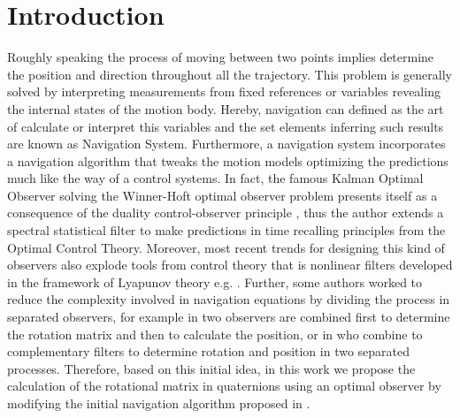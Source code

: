 \documentclass[10pt,conference]{IEEEtran}
\begin{document}
\section{Introduction}
Roughly speaking the process of moving between two points implies determine the position and direction throughout all the trajectory. This problem is generally solved by interpreting measurements from fixed references or variables revealing the internal states of the motion body. Hereby, navigation can defined as the art of calculate or interpret this variables and the set elements inferring such results are  known as Navigation System. Furthermore, a navigation system incorporates a navigation algorithm that tweaks the motion models optimizing the predictions much like the way of a control systems.  In fact, the famous Kalman Optimal Observer solving the Winner-Hoft optimal observer problem presents itself as a consequence of the duality control-observer principle \cite{Kalman1960}, thus the author extends a spectral statistical filter to make predictions in time recalling principles from the Optimal Control Theory. Moreover, most recent trends for designing this kind of observers also explode tools from control theory that is nonlinear filters developed in the framework of Lyapunov theory e.g. \cite{Lukyanov1996,Nicosia1996}. Further, some authors worked to reduce the complexity involved in navigation equations by dividing the process in separated observers, for example in \cite{Vasconcelos2008} two observers are combined first to determine the rotation matrix and then to calculate the position, or in \cite{Scandaro2011} who combine to complementary filters to determine rotation and position in two separated processes.  Therefore, based on this initial idea, in this work we propose the calculation of the rotational matrix in quaternions using an optimal observer by modifying the initial navigation algorithm proposed in \cite{Scandaro2011}.\par
%
\end{document}
